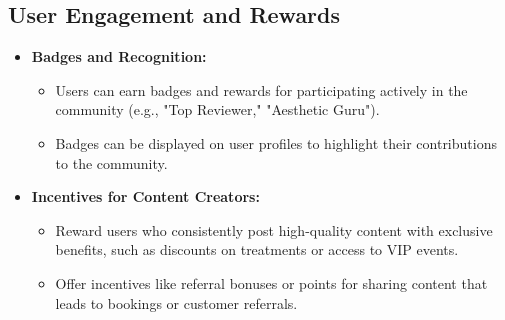 \subsection{User Engagement and Rewards}
\begin{itemize}
    \item \textbf{Badges and Recognition:}
    \begin{itemize}
        \item Users can earn badges and rewards for participating actively in the community (e.g., "Top Reviewer," "Aesthetic Guru").
        \item Badges can be displayed on user profiles to highlight their contributions to the community.
    \end{itemize}
    
    \item \textbf{Incentives for Content Creators:}
    \begin{itemize}
        \item Reward users who consistently post high-quality content with exclusive benefits, such as discounts on treatments or access to VIP events.
        \item Offer incentives like referral bonuses or points for sharing content that leads to bookings or customer referrals.
    \end{itemize}
    
\end{itemize}

